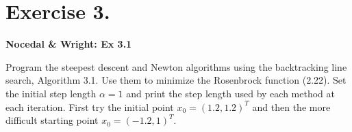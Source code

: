
\section*{Exercise 3.}

\textbf{Nocedal \& Wright: Ex 3.1 }

Program the steepest descent and Newton algorithms using the backtracking line search, Algorithm 3.1. Use them to minimize the Rosenbrock function (2.22). Set the initial step length $\alpha = 1$ and print the step length used by each method at each iteration. First try the initial point $x_0 = (1.2,1.2)^T$ and then the more difficult starting point $x_0 = (-1.2, 1)^T$.
